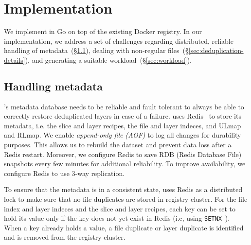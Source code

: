 \section{Implementation}
\label{sec:impl}

We implement \sysname in Go on top of the existing Docker registry. In our implementation,
we address a set of challenges regarding distributed, reliable handling of
metadata~(\S\ref{sec:handling-metadata}), dealing with non-regular files~(\S\ref{sec:deduplication-details}),
and generating a suitable workload~(\S\ref{sec:workload}).

\subsection{Handling metadata}
\label{sec:handling-metadata}

\sysname{}'s metadata database needs to be reliable and fault tolerant to always be
able to correctly restore deduplicated layers in case of a failure.
%
\sysname uses Redis~\cite{redis} to store its metadata, i.e.
the slice and layer recipes, the file and layer indeces, and ULmap and RLmap.
%
We enable \emph{append-only file (AOF)} to log all changes for durability purposes.
This allows us to rebuild the dataset and prevent data loss after a Redis restart.
%
Moreover, we configure Redis to save RDB (Redis Database File) snapshots every few minutes for additional
reliability. To improve availability, we configure Redis to use 3-way replication.


%
To ensure that the metadata is in a consistent state, \sysname uses Redis as a distributed
lock to make sure that no file duplicates are stored in registry cluster.
%
For the file index and layer indeces and the slice and layer recipes,
each key can be set to hold its value only if
the key does not yet exist in Redis (i.e, using \texttt{SETNX}~\cite{SETNX}).
%
When a key already holds a value, a file duplicate or
layer duplicate is identified and is removed from the registry cluster.

